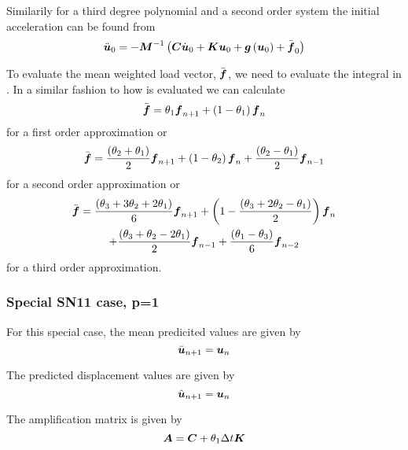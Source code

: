 Similarily for a third degree polynomial and a second order system the initial
acceleration can be found from
\begin{equation}
  \ddot{\vectr{u}}_{0}=-\inverse{\matr{M}}\pbrac{\matr{C}\dot{\vectr{u}}_{0}+\matr{K}\vectr{u}_{0}+
    \fnof{\vectr{g}}{\vectr{u}_{0}}+\bar{\vectr{f}}_{0}}
\end{equation}

To evaluate the mean weighted load vector, $\bar{\boldsymbol{f}}$, we need to
evaluate the integral in . In a similar
fashion to how  is evaluated we can
calculate
\begin{equation}
  \bar{\vectr{f}}=\theta_{1}\vectr{f}_{n+1}+\pbrac{1-\theta_{1}}\vectr{f}_{n}
  \label{eqn:firstordermeanweightedloadvector}
\end{equation}
for a first order approximation or
\begin{equation}
  \bar{\vectr{f}}=\dfrac{\pbrac{\theta_{2}+\theta_{1}}}{2}\vectr{f}_{n+1}+\pbrac{1-\theta_{2}}\vectr{f}_{n}
  +\dfrac{\pbrac{\theta_{2}-\theta_{1}}}{2}\vectr{f}_{n-1}
  \label{eqn:secondordermeanweightedloadvector}
\end{equation}
for a second order approximation or
\begin{multline}
  \bar{\vectr{f}}=\dfrac{\pbrac{\theta_{3}+3\theta_{2}+2\theta_{1}}}{6}\vectr{f}_{n+1}
  +\pbrac{1-\dfrac{\pbrac{\theta_{3}+2\theta_{2}-\theta_{1}}}{2}}\vectr{f}_{n} \\
  +\dfrac{\pbrac{\theta_{3}+\theta_{2}-2\theta_{1}}}{2}\vectr{f}_{n-1}
  +\dfrac{\pbrac{\theta_{1}-\theta_{3}}}{6}\vectr{f}_{n-2}
  \label{eqn:thirdordermeanweightedloadvector}
\end{multline}
for a third order approximation.

\subsubsection{Special SN11 case, p=1}

For this special case, the mean predicited values are given by
\begin{equation}
   \bar{\boldsymbol{u}}_{n+1} = \boldsymbol{u}_{n}
\end{equation}

The predicted displacement values are given by
\begin{equation}
   \hat{\boldsymbol{u}}_{n+1} = \boldsymbol{u}_{n}
\end{equation}

The amplification matrix is given by
\begin{equation}
  \matr{A}=\matr{C}+\theta_{1}\Delta t \matr{K}
\end{equation}

